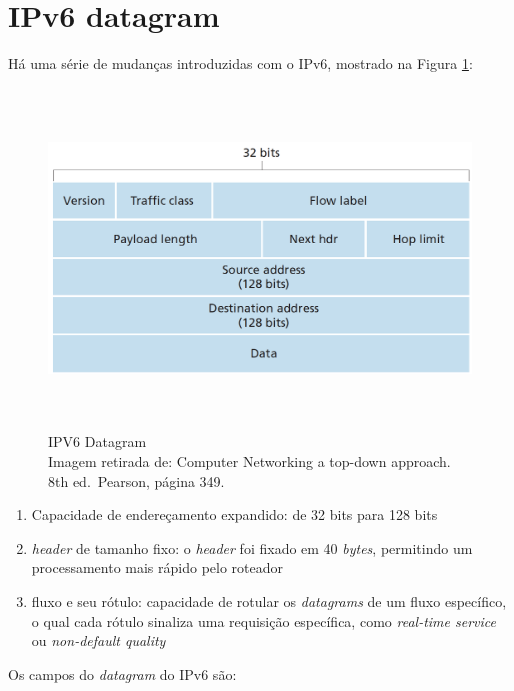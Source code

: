 \hypertarget{ipv6-datagram}{%
\section{IPv6 datagram}\label{ipv6-datagram}}

Há uma série de mudanças introduzidas com o IPv6, mostrado na Figura \ref{IPV6 Datagram}:


\begin{figure}[h!]
\centering
\includegraphics[keepaspectratio, width=12cm, height=9cm]{imagens/13/13 - IPv6 datagram.png}
\caption{IPV6 Datagram \\
Imagem retirada de: Computer Networking a top-down approach. 8th
ed.~Pearson, página 349. \\}
\label{IPV6 Datagram}
\end{figure}


\begin{enumerate}
\def\labelenumi{\arabic{enumi}.}
\tightlist
\item
  Capacidade de endereçamento expandido: de 32 bits para 128 bits
\item
  \emph{header} de tamanho fixo: o \emph{header} foi fixado em 40
  \emph{bytes}, permitindo um processamento mais rápido pelo roteador
\item
  fluxo e seu rótulo: capacidade de rotular os \emph{datagrams} de um
  fluxo específico, o qual cada rótulo sinaliza uma requisição
  específica, como \emph{real-time service} ou \emph{non-default
  quality}
\end{enumerate}

Os campos do \emph{datagram} do IPv6 são:

